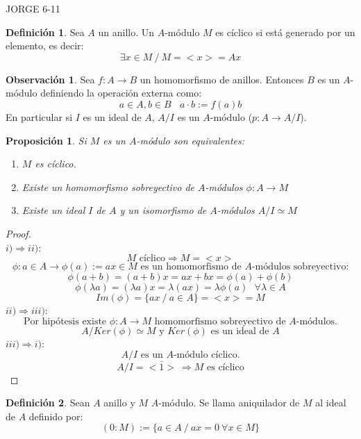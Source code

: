 \documentclass{article}
\theoremstyle{theorem-style}  %
\newtheorem{proposition}[theorem]{Proposición}
\theoremstyle{definition}
\newtheorem{definition}{Definición}[section]
\newtheorem*{observation}{Observación} %
\theoremstyle{example-style}
\begin{document}
JORGE 6-11

\begin{definition}
	Sea $A$ un anillo. Un $A$-módulo $M$ es cíclico si está generado por un elemento, es decir:
	\[\exists x  \in M \ / \   M=<x>=Ax\]
\end{definition}

\begin{observation}
	Sea $f:A\rightarrow B$ un homomorfismo de anillos. Entonces $B$ es un $A$-módulo definiendo la operación
	externa como:\[
		a\in A,b\in B \ \ \ \ a\cdot b :=f(a)b
	\]
	En particular si $I$ es un ideal de $A$, $A/I$ es un $A$-módulo ($p:A\rightarrow A/I$).
\end{observation}

\begin{proposition}
	Si $M$ es un $A$-módulo son equivalentes:
	\begin{enumerate}[\hspace{1cm}i)]
		\item $M$ es cíclico.
		\item Existe un homomorfismo sobreyectivo de $A$-módulos $\phi :A\rightarrow M$
		\item Existe un ideal $I$ de $A$ y un isomorfismo de $A$-módulos $A/I \simeq M$
	\end{enumerate}
\end{proposition}

\begin{proof} \ \\
	$i)\Rightarrow ii)$:
	\[ M \text{ cíclico}\Rightarrow M=<x>\]
	\[ \phi :a \in A\rightarrow \phi (a):=ax \in M \text{ es un homomorfismo de $A$-módulos sobreyectivo:}\]
	\[ \phi(a+b)=(a+b)x=ax+bx=\phi(a)+\phi(b)\]
	\[ \phi(\lambda a)=(\lambda a)x= \lambda(ax)=\lambda\phi(a) \ \ \ \forall\lambda\in A \]
	\[ Im(\phi)=\{ax \ / \ a\in A \} = <x>=M\]
	$ii)\Rightarrow iii)$:
	\[ \text{Por hipótesis existe } \phi:A\rightarrow M \text{ homomorfismo sobreyectivo de $A$-módulos.}\]
	\[ A/Ker(\phi) \simeq M \text{ y $Ker(\phi)$ es un ideal de } A \]
	$iii)\Rightarrow i)$:
	\[ A/I \text{ es un $A$-módulo cíclico.} \]
	\[ A/I=<\bar{1}>\ \Rightarrow\text{$M$ es cíclico} \]
\end{proof}

\begin{definition}
	Sean $A$ anillo y $M$ $A$-módulo. Se llama aniquilador de $M$ al ideal de $A$ definido por:
	\[(0:M):=\{a\in A \ / \ ax=0 \  \forall x \in M\}\]
\end{definition}
\end{document}
